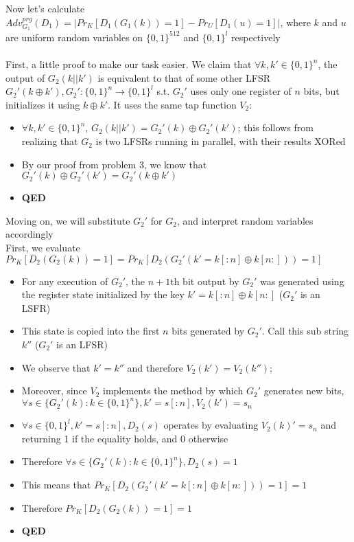 \documentclass[]{article}
\begin{document}
Now let's calculate $Adv^{prg}_{G_1}(D_1) = |Pr_K[D_1(G_1(k)) = 1] - Pr_U[D_1(u)=1]|$, where $k$ and $u$ are uniform random variables on $\{0,1\}^{512}$ and $\{0,1\}^l$ respectively
\\\\
First, a little proof to make our task easier. We claim that $\forall k,k' \in \{0,1\}^n$, the output of $G_2(k || k')$ is equivalent to that of some other LFSR $G_2'(k \oplus k'), G_2':\{0,1\}^{n} \rightarrow \{0,1\}^l$ s.t. $G_2'$ uses only one register of $n$ bits, but initializes it using $k \oplus k'$. It uses the same tap function $V_2$:
\begin{itemize}
	\item $\forall k, k' \in \{0,1\}^n$, $G_2(k || k') = G_2'(k) \oplus G_2'(k')$; this follows from realizing that $G_2$ is two LFSRs running in parallel, with their results XORed
	\item By our proof from problem 3, we know that $G_2'(k) \oplus G_2'(k') = G_2'(k \oplus k')$
	\item \textbf{QED}
\end{itemize} 
Moving on, we will substitute $G_2'$ for $G_2$, and interpret random variables accordingly\\
First, we evaluate $Pr_K[D_2(G_2(k)) = 1] = Pr_K[D_2(G_2'(k' = k[:n] \oplus k[n:])) = 1]$
\begin{itemize}
	\item For any execution of $G_2'$, the $n + 1$th bit output by $G_2'$ was generated using the register state initialized by the key $k' = k[:n] \oplus k[n:]$ ($G_2'$ is an LSFR)
	\item This state is copied into the first $n$ bits generated by $G_2'$. Call this sub string $k''$ ($G_2'$ is an LFSR)
	\item We observe that $k' = k''$ and therefore $V_2(k') = V_2(k'')$;
	\item Moreover, since $V_2$ implements the method by which $G_2'$ generates new bits, $\forall s \in \{G_2'(k): k \in \{0,1\}^n\}, k' = s[:n], V_2(k') = s_{n}$
	\item $\forall s \in \{0,1\}^l, k' = s[:n], D_2(s)$ operates by evaluating $V_2(k)' = s_{n}$ and returning  1 if the equality holds, and 0 otherwise
	\item Therefore $\forall s \in \{G_2'(k): k \in \{0,1\}^n\}, D_2(s) = 1$
	\item This means that $Pr_K[D_2(G_2'(k' = k[:n] \oplus k[n:])) = 1] = 1$
	\item Therefore $Pr_K[D_2(G_2(k)) = 1] = 1$
	\item \textbf{QED}
\end{itemize}
\end{document}
